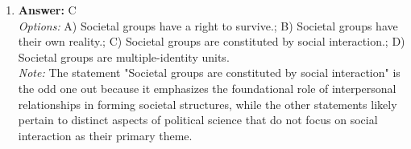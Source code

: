 \documentclass[12pt]{article}
\begin{document}
\begin{enumerate}[label=\arabic*.]
\\ \textit{Note:} The correct answer is accurate because the Supreme Court has interpreted various amendments in the Bill of Rights to collectively imply a right to privacy, establishing that this right is not explicitly mentioned but is essential to the protection of individual liberties.
\item \textbf{Answer:} C
\\ \textit{Options:} A) Societal groups have a right to survive.; B) Societal groups have their own reality.; C) Societal groups are constituted by social interaction.; D) Societal groups are multiple-identity units.
\\ \textit{Note:} The statement "Societal groups are constituted by social interaction" is the odd one out because it emphasizes the foundational role of interpersonal relationships in forming societal structures, while the other statements likely pertain to distinct aspects of political science that do not focus on social interaction as their primary theme.
\end{enumerate}
\end{document}
